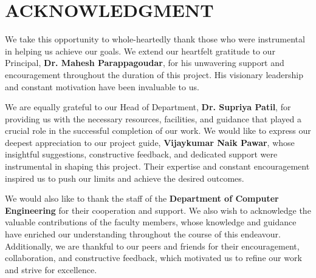 \pagestyle{fancy} %

\fancyhf{}

\fancyfoot[R]{\thepage} %



\renewcommand{\headrulewidth}{0pt}

\newpage
{} %
\setcounter{page}{1} %
\chapter*{\centering  ACKNOWLEDGMENT}
\justify

We take this opportunity to whole-heartedly thank those who were instrumental in helping us achieve our goals. We extend our heartfelt gratitude to our Principal, \textbf{Dr. Mahesh Parappagoudar}, for his unwavering support and encouragement throughout the duration of this project. His visionary leadership and constant motivation have been invaluable to us. 

We are equally grateful to our Head of Department, \textbf{Dr. Supriya Patil}, for providing us with the necessary resources, facilities, and guidance that played a crucial role in the successful completion of our work. We would like to express our deepest appreciation to our project guide, \textbf{Vijaykumar Naik Pawar}, whose insightful suggestions, constructive feedback, and dedicated support were instrumental in shaping this project. Their expertise and constant encouragement inspired us to push our limits and achieve the desired outcomes.

We would also like to thank the staff of the \textbf{Department of Computer Engineering} for their cooperation and support. We also wish to acknowledge the valuable contributions of the faculty members, whose knowledge and guidance have enriched our understanding throughout the course of this endeavour. Additionally, we are thankful to our peers and friends for their encouragement, collaboration, and constructive feedback, which motivated us to refine our work and strive for excellence.
